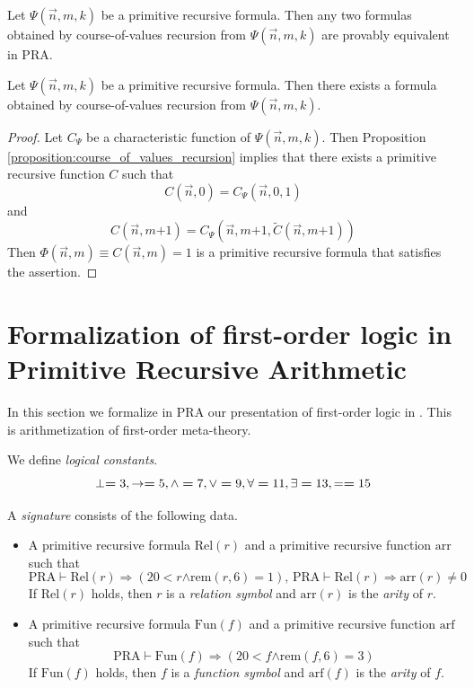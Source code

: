 \documentclass[10pt]{amsart}
\newcommand{\mra}{\boldsymbol{\Rightarrow}}
\newcommand{\mand}{\boldsymbol{\wedge}}
\newcommand{\mle}{\boldsymbol{<}}
\newcommand{\meq}{\boldsymbol{=}}
\newcommand{\mneq}{\boldsymbol{\neq}}
\newcommand{\mplus}{\boldsymbol{+}}
\begin{document}
\begin{remark}\label{remark:all_course_of_values_formulas_are_equivalent}
	Let $\Psi(\vec{n},m,k)$ be a primitive recursive formula. Then any two formulas obtained by course-of-values recursion from $\Psi(\vec{n},m,k)$ are provably equivalent in $\mathrm{PRA}$.
\end{remark}

\begin{corollary}\label{corollary:primitive_recursive_formulas_can_be_defined_by_course_of_values_recursion}
	Let $\Psi(\vec{n},m,k)$ be a primitive recursive formula. Then there exists a formula obtained by course-of-values recursion from $\Psi(\vec{n},m,k)$.
\end{corollary}
\begin{proof}
	Let $C_{\Psi}$ be a characteristic function of $\Psi(\vec{n},m,k)$. Then Proposition \ref{proposition:course_of_values_recursion} implies that there exists a primitive recursive function $C$ such that
	$$C(\vec{n},0) \meq C_{\Psi}(\vec{n},0,1)$$
	and
	$$C(\vec{n},m \mplus 1) \meq C_{\Psi}\left(\vec{n},m \mplus 1,\tilde{C}(\vec{n},m \mplus 1)\right)$$
	Then $\Phi(\vec{n},m) \equiv C(\vec{n},m) \meq 1$ is a primitive recursive formula that satisfies the assertion.
\end{proof}

\section{Formalization of first-order logic in Primitive Recursive Arithmetic}
\noindent
In this section we formalize in $\mathrm{PRA}$ our presentation of first-order logic in \cite{Systems_of_first_order_logic}. This is arithmetization of first-order meta-theory.

\begin{definition}
	We define \textit{logical constants}.
  $$\perp \meq 3,\ra \meq 5,\wedge \meq 7,\vee \meq 9, \forall \meq 11, \exists \meq 13, = \meq 15$$
\end{definition}

\begin{definition}
	A \textit{signature} consists of the following data.
	\begin{itemize}
		\item A primitive recursive formula $\mathrm{Rel}(r)$ and a primitive recursive function $\mathrm{arr}$ such that
		      $$\mathrm{PRA}\vdash \mathrm{Rel}(r) \mra \left(20 \mle r \mand \mathrm{rem}(r,6) \meq 1\right),\,\mathrm{PRA}\vdash \mathrm{Rel}(r) \mra \mathrm{arr}(r) \mneq 0$$
		      If $\mathrm{Rel}(r)$ holds, then $r$ is a \textit{relation symbol} and $\mathrm{arr}(r)$ is the \textit{arity} of $r$.
		\item A primitive recursive formula $\mathrm{Fun}(f)$ and a primitive recursive function $\mathrm{arf}$ such that
		      $$\mathrm{PRA}\vdash \mathrm{Fun}(f) \mra \left(20 \mle f \mand \mathrm{rem}(f,6) \meq 3\right)$$
		      If $\mathrm{Fun}(f)$ holds, then $f$ is a \textit{function symbol} and $\mathrm{arf}(f)$ is the \textit{arity} of $f$.
	\end{itemize}
\end{definition}
\end{document}
